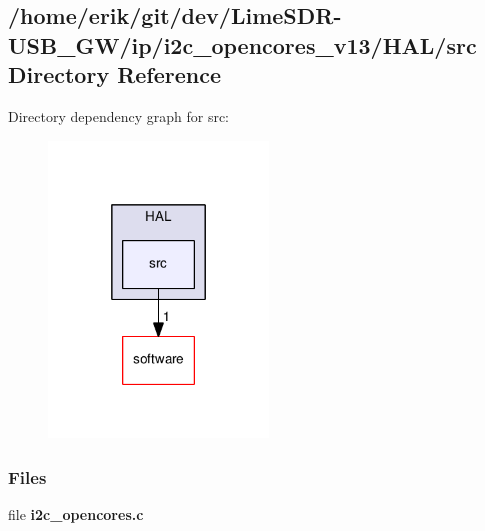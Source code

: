 \subsection{/home/erik/git/dev/\+Lime\+S\+D\+R-\/\+U\+S\+B\+\_\+\+G\+W/ip/i2c\+\_\+opencores\+\_\+v13/\+H\+A\+L/src Directory Reference}
\label{dir_217cb6afffbc09f164a33c44fdf24728}
Directory dependency graph for src\+:
\nopagebreak
\begin{figure}[H]
\begin{center}
\leavevmode
\includegraphics[width=166pt]{dir_217cb6afffbc09f164a33c44fdf24728_dep}
\end{center}
\end{figure}
\subsubsection*{Files}
\begin{DoxyCompactItemize}
\item 
file {\bf i2c\+\_\+opencores.\+c}
\end{DoxyCompactItemize}
